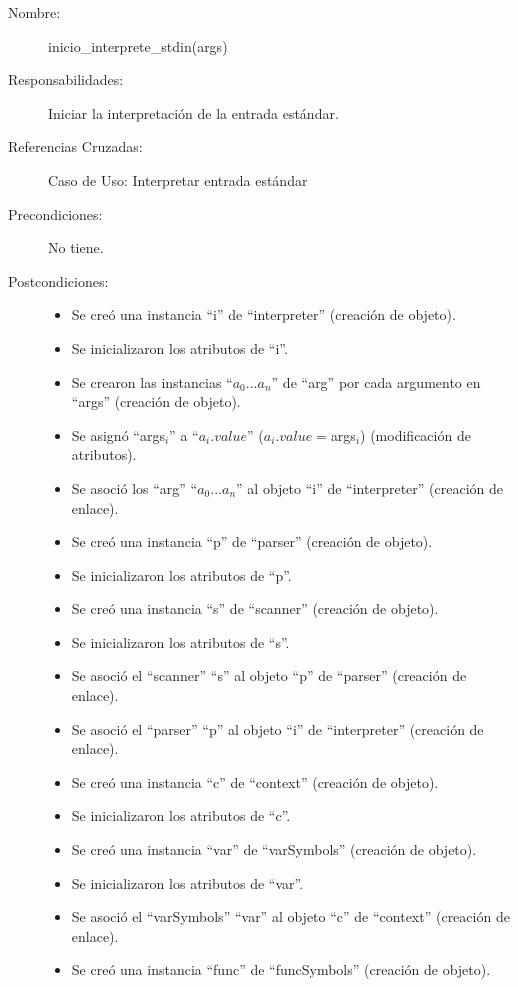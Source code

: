 	\begin{description}
		\item [Nombre:] inicio\_interprete\_stdin(args)
		\item [Responsabilidades:] Iniciar la interpretación de la entrada estándar.
		\item [Referencias Cruzadas: ] Caso de Uso: Interpretar entrada estándar
      \item [Precondiciones:] No tiene.
      \item [Postcondiciones:] \hfill
      \begin {itemize}
         \item Se creó una instancia ``i'' de ``interpreter'' (creación de objeto).
         \item Se inicializaron los atributos de ``i''.
         \item Se crearon las instancias ``$a_0...a_n$'' de ``arg'' por cada argumento en ``args'' (creación de objeto).
         \item Se asignó ``args$_i$'' a ``$a_i.value$'' ($a_i.value = $args$_i$) (modificación de atributos).
         \item Se asoció los ``arg'' ``$a_0...a_n$'' al objeto ``i'' de ``interpreter'' (creación de enlace).
         \item Se creó una instancia ``p'' de ``parser'' (creación de objeto).
         \item Se inicializaron los atributos de ``p''.
         \item Se creó una instancia ``s'' de ``scanner'' (creación de objeto).
         \item Se inicializaron los atributos de ``s''.
         \item Se asoció el ``scanner'' ``s'' al objeto ``p'' de ``parser'' (creación de enlace).
         \item Se asoció el ``parser'' ``p'' al objeto ``i'' de ``interpreter'' (creación de enlace).
         \item Se creó una instancia ``c'' de ``context'' (creación de objeto).
         \item Se inicializaron los atributos de ``c''.
         \item Se creó una instancia ``var'' de ``varSymbols'' (creación de objeto).
         \item Se inicializaron los atributos de ``var''.
         \item Se asoció el ``varSymbols'' ``var'' al objeto ``c'' de ``context'' (creación de enlace).
         \item Se creó una instancia ``func'' de ``funcSymbols'' (creación de objeto).

\end{itemize}
\end{description}
